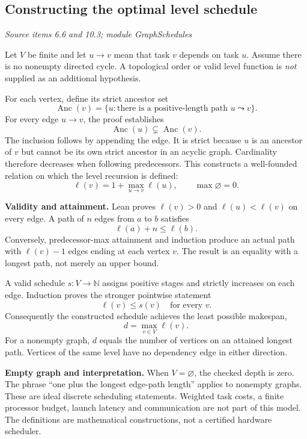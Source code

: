 \documentclass[11pt,letterpaper]{article}
\theoremstyle{definition}
\theoremstyle{remark}
\let\KomorebiPrimitiveMathbb\mathbb
\renewcommand{\mathbb}[1]{{\KomorebiPrimitiveMathbb{#1}}}
\begin{document}
\subsection{Constructing the optimal level schedule}\label{supp5:subsection:001}\textit{Source items 6.6 and 10.3; module GraphSchedules}\par
Let $V$ be finite and let $u\to v$ mean that task $v$ depends on task $u$. Assume there is no nonempty directed cycle. A topological order or valid level function is \emph{not} supplied as an additional hypothesis.

For each vertex, define its strict ancestor set
\[
\operatorname{Anc}(v)=\{u:\text{there is a positive-length path }u\leadsto v\}.
\]
For every edge $u\to v$, the proof establishes
\[
\operatorname{Anc}(u)\subsetneq\operatorname{Anc}(v).
\]
The inclusion follows by appending the edge. It is strict because $u$ is an ancestor of $v$ but cannot be its own strict ancestor in an acyclic graph. Cardinality therefore decreases when following predecessors. This constructs a well-founded relation on which the level recursion is defined:
\[
\boxed{\ell(v)=1+\max_{u\to v}\ell(u),\qquad \max\varnothing=0.}
\]

\textbf{Validity and attainment.} Lean proves $\ell(v)>0$ and $\ell(u)<\ell(v)$ on every edge. A path of $n$ edges from $a$ to $b$ satisfies
\[
\ell(a)+n\leq\ell(b).
\]
Conversely, predecessor-max attainment and induction produce an actual path with $\ell(v)-1$ edges ending at each vertex $v$. The result is an equality with a longest path, not merely an upper bound.

A valid schedule $s:V\to\mathbb N$ assigns positive stages and strictly increases on each edge. Induction proves the stronger pointwise statement
\[
\ell(v)\leq s(v)\quad\text{for every }v.
\]
Consequently the constructed schedule achieves the least possible makespan,
\[
\boxed{d=\max_{v\in V}\ell(v).}
\]
For a nonempty graph, $d$ equals the number of vertices on an attained longest path. Vertices of the same level have no dependency edge in either direction.

\textbf{Empty graph and interpretation.} When $V=\varnothing$, the checked depth is zero. The phrase ``one plus the longest edge-path length'' applies to nonempty graphs. These are ideal discrete scheduling statements. Weighted task costs, a finite processor budget, launch latency and communication are not part of this model. The definitions are mathematical constructions, not a certified hardware scheduler.
\end{document}
